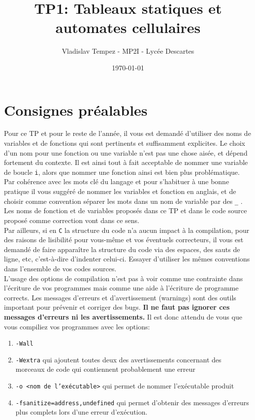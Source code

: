 \documentclass[11pt]{article}
\author{Vladislav Tempez - MP2I - Lycée Descartes}
\date{\today}
\title{TP1: Tableaux statiques et automates cellulaires}
\begin{document}
\maketitle

\section{Consignes préalables}
\label{sec:org32e8bc8}
Pour ce TP et pour le reste de l'année, il vous est demandé d'utiliser des noms de variables et de fonctions qui sont pertinents et suffisamment explicites. Le choix d'un nom pour une fonction ou une variable n'est pas une chose aisée, et dépend fortement du contexte.
Il est ainsi tout à fait acceptable de nommer une variable de boucle \texttt{i}, alors que nommer une fonction ainsi est bien plus problématique.
Par cohérence avec les mots clé du langage et pour s'habituer à une bonne pratique il vous suggéré de nommer les variables et fonction en anglais, et de choisir comme convention séparer les mots dans un nom de variable par des \texttt{\_} .
Les noms de fonction et de variables proposés dans ce TP et dans le code source proposé comme correction vont dans ce sens.\\

Par ailleurs, si en \texttt{C} la structure du code n'a aucun impact à la compilation, pour des raisons de lisibilité pour vous-même et vos éventuels correcteurs, il vous est demandé de faire apparaître la structure du code via des espaces, des sauts de ligne, etc, c'est-à-dire d'indenter celui-ci. Essayer d'utiliser les mêmes conventions dans l'ensemble de vos codes sources.\\

L'usage des options de compilation n'est pas à voir comme une contrainte dans l'écriture de vos programmes mais comme une aide à l'écriture de programme corrects. Les messages d'erreurs et d'avertissement (warnings) sont des outils important pour prévenir et corriger des bugs. \textbf{Il ne faut pas ignorer ces messages d'erreurs ni les avertissements.}
Il est donc attendu de vous que vous compiliez vos programmes avec les options:
\begin{enumerate}
\item \texttt{-Wall}
\item \texttt{-Wextra} qui ajoutent toutes deux des avertissements concernant des morceaux de code qui contiennent probablement une erreur
\item \texttt{-o <nom de l’exécutable>} qui permet de nommer l'exécutable produit
\item \texttt{-fsanitize=address,undefined} qui permet d'obtenir des messages d'erreurs plus complets lors d'une erreur d'exécution.
\end{enumerate}
\end{document}
